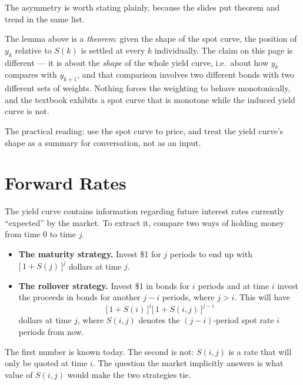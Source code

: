 \suppstart
\begin{note}
	The asymmetry is worth stating plainly, because the slides put theorem and trend in the same list.

	The lemma above is a \emph{theorem}: given the shape of the spot curve, the position of $y_{k}$ relative to $S(k)$ is settled at every $k$ individually.
	The claim on this page is different --- it is about the \emph{shape} of the whole yield curve, i.e.\ about how $y_{k}$ compares with $y_{k+1}$, and that comparison involves two different bonds with two different sets of weights.
	Nothing forces the weighting to behave monotonically, and the textbook exhibits a spot curve that is monotone while the induced yield curve is not.

	The practical reading: use the spot curve to price, and treat the yield curve's shape as a summary for conversation, not as an input.
\end{note}
\suppend

\section{Forward Rates}
\label{sec:forward-rates}


The yield curve contains information regarding future interest rates currently ``expected'' by the market.
To extract it, compare two ways of holding money from time $0$ to time $j$.

\begin{itemize}[itemsep=0.35em]
	\item \textbf{The maturity strategy.}
	      Invest \$1 for $j$ periods to end up with $\bigl[\,1+S(j)\,\bigr]^{j}$ dollars at time $j$.
	\item \textbf{The rollover strategy.}
	      Invest \$1 in bonds for $i$ periods and at time $i$ invest the proceeds in bonds for another $j-i$ periods, where $j>i$.
	      This will have
	      \[
		      \bigl[\,1+S(i)\,\bigr]^{i}\bigl[\,1+S(i,j)\,\bigr]^{j-i}
	      \]
	      dollars at time $j$, where $S(i,j)$ denotes the $(j-i)$-period spot rate $i$ periods from now.
\end{itemize}

\suppstart
The first number is known today.
The second is not: $S(i,j)$ is a rate that will only be quoted at time $i$.
The question the market implicitly answers is what value of $S(i,j)$ would make the two strategies tie.

